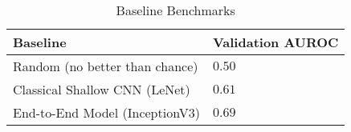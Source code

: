 \begin{table}[H]
    \centering
    \begin{tabular}{@{}ll@{}}
    \toprule
    Baseline                        & Validation AUROC \\ \midrule
    Random (no better than chance)  & \(0.50\)         \\
    Classical Shallow CNN (LeNet)   & \(0.61\)         \\
    End-to-End Model (InceptionV3)  & \(0.69\)         \\ \bottomrule
    \end{tabular}
    \caption{Baseline Benchmarks}\label{tab:endpoints}
\end{table}